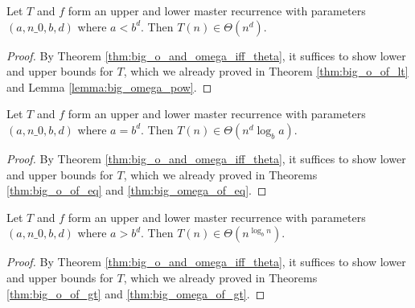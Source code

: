 \begin{corollary}
    \label{thm:theta_of_lt}
    \leanok
    Let $T$ and $f$ form an upper and lower master recurrence with parameters 
    $(a, n\_0, b, d)$ where $a < b^d$. Then $T(n) \in \Theta(n^d)$.
\end{corollary}

\begin{proof}
    \leanok
    By Theorem \ref{thm:big_o_and_omega_iff_theta}, it suffices to show
    lower and upper bounds for $T$, which we already proved in Theorem
    \ref{thm:big_o_of_lt} and Lemma \ref{lemma:big_omega_pow}.
\end{proof}

\begin{corollary}
    \label{thm:theta_of_eq}
    \leanok
    Let $T$ and $f$ form an upper and lower master recurrence with parameters 
    $(a, n\_0, b, d)$ where $a = b^d$. Then $T(n) \in \Theta(n^d \log_b{a})$.
\end{corollary}

\begin{proof}
    \leanok
    By Theorem \ref{thm:big_o_and_omega_iff_theta}, it suffices to show
    lower and upper bounds for $T$, which we already proved in Theorems
    \ref{thm:big_o_of_eq} and \ref{thm:big_omega_of_eq}.
\end{proof}

\begin{corollary}
    \label{thm:theta_of_gt}
    \leanok
    Let $T$ and $f$ form an upper and lower master recurrence with parameters 
    $(a, n\_0, b, d)$ where $a > b^d$. Then $T(n) \in \Theta(n^{\log_b{n}})$.
\end{corollary}

\begin{proof}
    \leanok
    By Theorem \ref{thm:big_o_and_omega_iff_theta}, it suffices to show
    lower and upper bounds for $T$, which we already proved in Theorems
    \ref{thm:big_o_of_gt} and \ref{thm:big_omega_of_gt}.
\end{proof}
